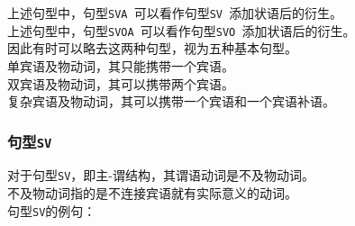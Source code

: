 \documentclass[UTF8]{ctexart}
\newcommand{\LiDrawContainer}[6][solid]
{
    \coordinate (A1) at #2;
    \coordinate (A2) at #3;
    \coordinate (B1) at ($#2+(0,#4)$);
    \coordinate (B2) at ($#3+(0,#4)$);

    \draw (A1)--(B1);
    \draw[#1] (A2)--(B2);
    \draw (B1)--(B2);

    \node at($0.5*(B1)+0.5*(B2)+(0,#5)$) {#6};
}
\begin{document}
    上述句型中，句型\texttt{SVA~}可以看作句型\texttt{SV~}添加状语后的衍生。\\[3mm]
    上述句型中，句型\texttt{SVOA~}可以看作句型\texttt{SVO~}添加状语后的衍生。\\[3mm]
    因此有时可以略去这两种句型，视为五种基本句型。\\[6mm]
    单宾语及物动词，其只能携带一个宾语。\\[3mm]
    双宾语及物动词，其可以携带两个宾语。\\[3mm]
    复杂宾语及物动词，其可以携带一个宾语和一个宾语补语。\\[6mm]

\newpage

\subsubsection{句型\texttt{SV}}
    对于句型\texttt{SV}，即主-谓结构，其谓语动词是不及物动词。\\[3mm]
    不及物动词指的是不连接宾语就有实际意义的动词。\\[3mm]
    句型\texttt{SV\hphantom{A}}的例句：
    \begin{center}
    \end{center}\vspace{-5pt}
\end{document}
